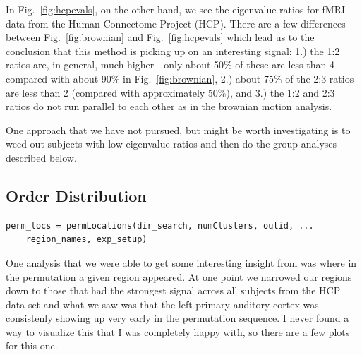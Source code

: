 \documentclass[11pt]{article}
\def\f{Fig.}
\begin{document}
In \f~\ref{fig:hcpevals}, on the other hand, we see the eigenvalue ratios for fMRI data from the Human Connectome Project (HCP). There are a few differences between \f~\ref{fig:brownian} and \f~\ref{fig:hcpevals} which lead us to the conclusion that this method is picking up on an interesting signal: 1.) the 1:2 ratios are, in general, much higher - only about 50\% of these are less than 4 compared with about 90\% in \f~\ref{fig:brownian}, 2.) about 75\% of the 2:3 ratios are less than 2 (compared with approximately 50\%), and 3.) the 1:2 and 2:3 ratios do not run parallel to each other as in the brownian motion analysis. 

One approach that we have not pursued, but might be worth investigating is to weed out subjects with low eigenvalue ratios and then do the group analyses described below.

\subsection{Order Distribution}

\begin{lstlisting}[frame=single]
perm_locs = permLocations(dir_search, numClusters, outid, ...
	region_names, exp_setup)
\end{lstlisting}

One analysis that we were able to get some interesting insight from was where in the permutation a given region appeared. At one point we narrowed our regions down to those that had the strongest signal across all subjects from the HCP data set and what we saw was that the left primary auditory cortex was consistenly showing up very early in the permutation sequence. I never found a way to visualize this that I was completely happy with, so there are a few plots for this one.
\end{document}
